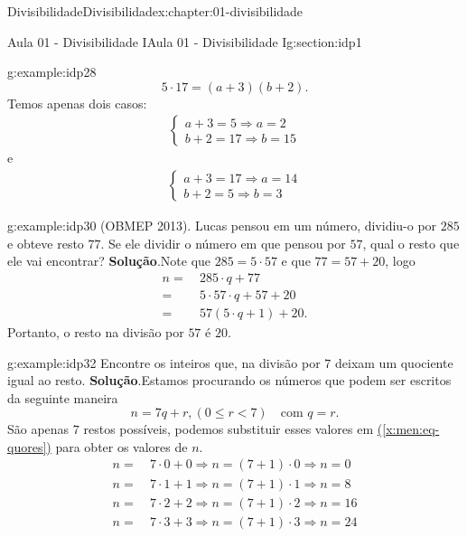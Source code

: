 \documentclass[oneside,10pt,]{book}
\newcommand{\blocktitlefont}{\relax}
\newcommand{\xreffont}{\relax}
\numberwithin{equation}{section}
\newcommand{\lt}{<}
\newcommand{\amp}{&}
\begin{document}
\begin{chapterptx}{Divisibilidade}{}{Divisibilidade}{}{}{x:chapter:01-divisibilidade}
\begin{sectionptx}{Aula 01 - Divisibilidade I}{}{Aula 01 - Divisibilidade I}{}{}{g:section:idp1}
\begin{example}{}{g:example:idp28}
\begin{equation*}
5\cdot 17 = (a+3)(b+2).
\end{equation*}
Temos apenas dois casos:%
\begin{gather*}
\begin{cases} 
a+3 = 5 \Rightarrow a = 2 \\ 
b+2 = 17 \Rightarrow b = 15  
\end{cases}
\end{gather*}
e%
\begin{gather*}
\begin{cases} 
a+3 = 17 \Rightarrow a = 14 \\ 
b+2 = 5 \Rightarrow b = 3  
\end{cases}
\end{gather*}
%
\end{example}
\begin{example}{}{g:example:idp30}%
(OBMEP 2013). Lucas pensou em um número, dividiu-o por \(285\) e obteve resto \(77\). Se ele dividir o número em que pensou por \(57\), qual o resto que ele vai encontrar?%
\textbf{\blocktitlefont Solução}.\hypertarget{g:solution:idp31}{}\quad{}Note que \(285 = 5\cdot 57\) e que \(77 = 57+20\), logo%
\begin{align*}
n=\amp~ 285\cdot q+77\\
=\amp~5\cdot 57\cdot q+57+20\\
=\amp~57(5\cdot q+1)+20.
\end{align*}
Portanto, o resto na divisão por \(57\) é \(20\).%
\end{example}
\begin{example}{}{g:example:idp32}%
Encontre os inteiros que, na divisão por \(7\) deixam um quociente igual ao resto.%
\textbf{\blocktitlefont Solução}.\hypertarget{g:solution:idp33}{}\quad{}Estamos procurando os números que podem ser escritos da seguinte maneira%
\begin{equation}
n = 7q+r, (0\leq r\lt 7)\quad \text{com } q=r.\label{x:men:eq-quores}
\end{equation}
São apenas \(7\) restos possíveis, podemos substituir esses valores em \hyperref[x:men:eq-quores]{({\xreffont\ref{x:men:eq-quores}})} para obter os valores de \(n\).%
\begin{align*}
n =\amp~ 7\cdot 0+0 \Rightarrow n= (7+1)\cdot 0\Rightarrow n=0\\
n =\amp~ 7\cdot 1+1 \Rightarrow n= (7+1)\cdot 1\Rightarrow n=8\\
n =\amp~ 7\cdot 2+2 \Rightarrow n= (7+1)\cdot 2\Rightarrow n=16\\
n =\amp~ 7\cdot 3+3 \Rightarrow n= (7+1)\cdot 3\Rightarrow n=24\\

\end{align*}
\end{example}
\end{sectionptx}
\end{chapterptx}
\end{document}
